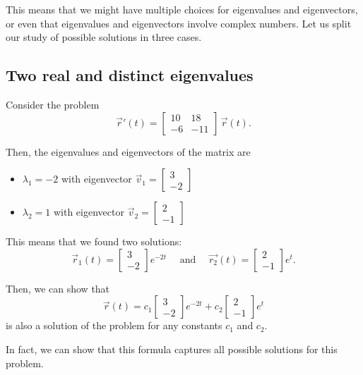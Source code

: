 This means that we might have multiple choices for eigenvalues and eigenvectors, or even that eigenvalues and eigenvectors involve complex numbers.
Let us split our study of possible solutions in three cases.




\subsection{Two real and distinct eigenvalues}

\begin{example}
Consider the problem
$$
\vec{r}'(t) = \begin{bmatrix}	
 10 & 18 \\ -6 & -11	
 \end{bmatrix} \, \vec{r}(t).
$$

Then, the eigenvalues and eigenvectors of the matrix are
\begin{itemize}
	\item $\lambda_1=-2$ with eigenvector $\vec{v}_1 = \begin{bmatrix} 3 \\ -2 \end{bmatrix}$
	\item $\lambda_2=1$ with eigenvector $\vec{v}_2 = \begin{bmatrix} 2 \\ -1 \end{bmatrix}$
\end{itemize}

This means that we found two solutions:
$$
\vec{r}_1(t) = \begin{bmatrix} 3 \\ -2 \end{bmatrix} e^{-2t}
\quad \text{ and } \quad \vec{r_2}(t) = \begin{bmatrix} 2 \\ -1 \end{bmatrix} e^{t}.
$$

Then, we can show that 
$$
\vec{r}(t) = c_1 \begin{bmatrix} 3 \\ -2 \end{bmatrix} e^{-2t}
+c_2\begin{bmatrix} 2 \\ -1 \end{bmatrix} e^{t}
$$
is also a solution of the problem for any constants $c_1$ and $c_2$.

In fact, we can show that this formula captures all possible solutions for this problem.
\end{example}


